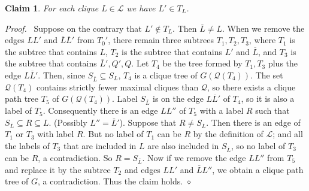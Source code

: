 \documentclass[11pt]{article}
\newtheorem{claim}{Claim}
\newenvironment{proofcl}{\noindent \emph{Proof.}\ }{Thus the claim
holds.  \hfill $\diamond$\vspace{1em}}
\begin{document}
\begin{claim}
   \label{claim:L'}
   For each clique $L \in \mathcal L$ we have $L'\in T_L$.
   \end{claim}
\begin{proofcl}
Suppose on the contrary that $L'\notin T_L$.  Then $\overline L\neq
L$.  When we remove the edges $LL'$ and $\overline L \overline L'$
from $T_0'$, there remain three subtrees $T_1, T_2, T_3$, where $T_1$
is the subtree that contains $L$, $T_2$ is the subtree that contains
$L'$ and $\overline L$, and $T_3$ is the subtree that contains
$\overline L', Q', Q$.  Let $T_4$ be the tree formed by $T_1, T_3$
plus the edge $L\overline L'$.  Then, since $S_{\overline L}\subseteq
S_L$, $T_4$ is a clique tree of $G(\mathcal Q(T_4))$.  The set
$\mathcal Q(T_4)$ contains strictly fewer maximal cliques than
$\mathcal Q$, so there exists a clique path tree $T_5$ of $G(\mathcal
Q(T_4))$.  Label $S_{\overline L}$ is on the edge $L\overline L'$ of
$T_4$, so it is also a label of $T_5$.  Consequently there is an edge
$LL''$ of $T_5$ with a label $R$ such that $S_{\overline L} \subseteq
R \subseteq L$.  (Possibly $L''=\overline L'$).  Suppose that $R\neq
S_{\overline L}$.  Then there is an edge of $T_1$ or $T_3$ with label
$R$.  But no label of $T_1$ can be $R$ by the definition of $\mathcal
L$; and all the labels of $T_3$ that are included in $L$ are also
included in $S_{\overline L}$, so no label of $T_3$ can be $R$, a
contradiction.  So $R=S_{\overline L}$.  Now if we remove the edge
$LL''$ from $T_5$ and replace it by the subtree $T_2$ and edges $LL'$
and $\overline L L''$, we obtain a clique path tree of $G$, a
contradiction.
\end{proofcl}
\end{document}
